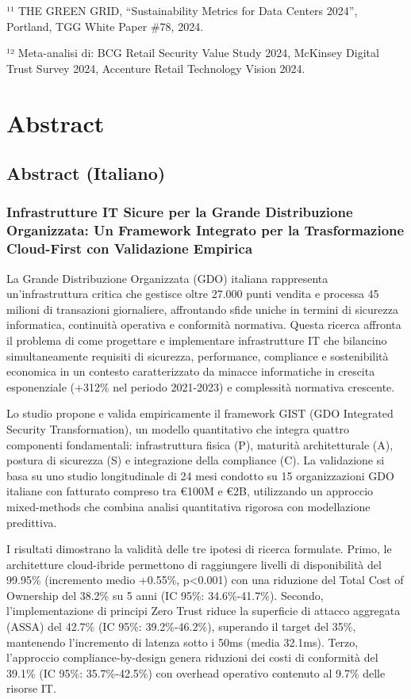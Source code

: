 \documentclass{report}
\begin{document}
¹¹ THE GREEN GRID, ``Sustainability Metrics for Data Centers 2024'',
Portland, TGG White Paper \#78, 2024.

¹² Meta-analisi di: BCG Retail Security Value Study 2024, McKinsey
Digital Trust Survey 2024, Accenture Retail Technology Vision 2024.

\section{Abstract}\label{abstract-1}

\subsection{Abstract (Italiano)}\label{abstract-italiano}

\subsubsection{Infrastrutture IT Sicure per la Grande Distribuzione
Organizzata: Un Framework Integrato per la Trasformazione Cloud-First
con Validazione
Empirica}\label{infrastrutture-it-sicure-per-la-grande-distribuzione-organizzata-un-framework-integrato-per-la-trasformazione-cloud-first-con-validazione-empirica}

La Grande Distribuzione Organizzata (GDO) italiana rappresenta
un'infrastruttura critica che gestisce oltre 27.000 punti vendita e
processa 45 milioni di transazioni giornaliere, affrontando sfide uniche
in termini di sicurezza informatica, continuità operativa e conformità
normativa. Questa ricerca affronta il problema di come progettare e
implementare infrastrutture IT che bilancino simultaneamente requisiti
di sicurezza, performance, compliance e sostenibilità economica in un
contesto caratterizzato da minacce informatiche in crescita esponenziale
(+312\% nel periodo 2021-2023) e complessità normativa crescente.

Lo studio propone e valida empiricamente il framework GIST (GDO
Integrated Security Transformation), un modello quantitativo che integra
quattro componenti fondamentali: infrastruttura fisica (P), maturità
architetturale (A), postura di sicurezza (S) e integrazione della
compliance (C). La validazione si basa su uno studio longitudinale di 24
mesi condotto su 15 organizzazioni GDO italiane con fatturato compreso
tra €100M e €2B, utilizzando un approccio mixed-methods che combina
analisi quantitativa rigorosa con modellazione predittiva.

I risultati dimostrano la validità delle tre ipotesi di ricerca
formulate. Primo, le architetture cloud-ibride permettono di raggiungere
livelli di disponibilità del 99.95\% (incremento medio +0.55\%,
p\textless0.001) con una riduzione del Total Cost of Ownership del
38.2\% su 5 anni (IC 95\%: 34.6\%-41.7\%). Secondo, l'implementazione di
principi Zero Trust riduce la superficie di attacco aggregata (ASSA) del
42.7\% (IC 95\%: 39.2\%-46.2\%), superando il target del 35\%,
mantenendo l'incremento di latenza sotto i 50ms (media 32.1ms). Terzo,
l'approccio compliance-by-design genera riduzioni dei costi di
conformità del 39.1\% (IC 95\%: 35.7\%-42.5\%) con overhead operativo
contenuto al 9.7\% delle risorse IT.
\end{document}

